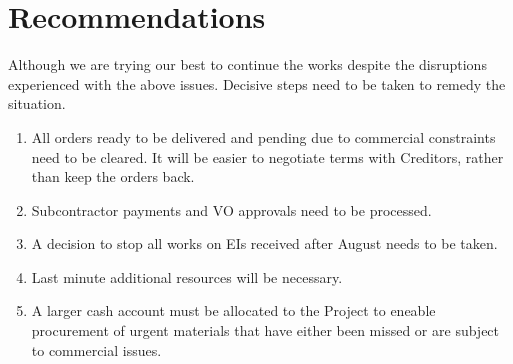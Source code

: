 \section*{Recommendations}

Although we are trying our best to continue the works despite the disruptions experienced with the above issues. Decisive steps need to be taken to remedy the situation.

\begin{enumerate}
\item All orders ready to be delivered and pending due to commercial constraints need to be cleared. It will be easier to negotiate terms with Creditors, rather than keep the orders back.

\item Subcontractor payments and VO approvals need to be processed.


\item A decision to stop all works on EIs received after August needs to be taken.

\item Last minute additional resources will be necessary.

\item A larger cash account must be allocated to the Project to eneable procurement of urgent materials that have either been missed or are subject to commercial issues.

\end{enumerate}

